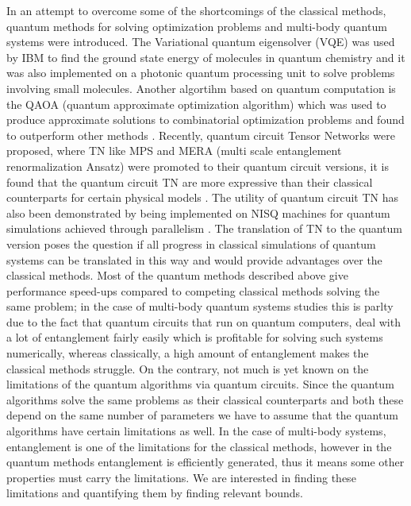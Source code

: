 \documentclass{physics_article}
\begin{document}
	In an attempt to overcome some of the shortcomings of the classical methods, quantum methods for solving optimization problems and multi-body quantum systems were introduced. The Variational quantum eigensolver (VQE) was used by IBM to find the ground state energy of molecules in  quantum chemistry \cite{kandala_mezzacapo_temme_takita_brink_chow_gambetta_2017} and it was also implemented on a photonic quantum processing unit \cite{peruzzo_mcclean_shadbolt_yung_zhou_love_aspuru-guzik_obrien_2014} to solve problems involving small molecules. Another algortihm based on quantum computation is the QAOA (quantum approximate optimization algorithm) which was used to produce approximate solutions to combinatorial optimization problems \cite{https://doi.org/10.48550/arxiv.1411.4028} and found to outperform other methods \cite{PhysRevX.10.021067}. Recently, quantum circuit Tensor Networks were proposed, where TN like MPS and MERA (multi scale entanglement renormalization Ansatz)\cite{vidal_2008} were promoted to their quantum circuit versions, it is found that the quantum circuit TN are more expressive than their classical counterparts for certain physical models \cite{haghshenas_gray_potter_chan_2022}. The utility of quantum circuit TN has also been demonstrated by being implemented on NISQ machines for quantum simulations achieved through parallelism \cite{barratt_dborin_bal_stojevic_pollmann_green_2021}. The translation of TN to the quantum version poses the question if all progress in classical simulations of quantum systems can be translated in this way and would provide advantages over the classical methods. Most of the quantum methods described above give performance speed-ups compared to competing classical methods solving the same problem; in the case of multi-body quantum systems studies this is parlty due to the fact that quantum circuits that run on quantum computers, deal with a lot of entanglement fairly easily which is profitable for solving such systems numerically, whereas classically, a high amount of entanglement makes the classical methods struggle. On the contrary, not much is yet known on the limitations of the quantum algorithms via quantum circuits. Since the quantum algorithms solve the same problems as their classical counterparts and both these depend on the same number of parameters we have to assume that the quantum algorithms have certain limitations as well. In the case of multi-body systems, entanglement is one of the limitations for the classical methods, however in the quantum methods entanglement is efficiently generated, thus it means some other properties must carry the limitations. We are interested in finding these limitations and quantifying them by finding relevant bounds. 
\end{document}

